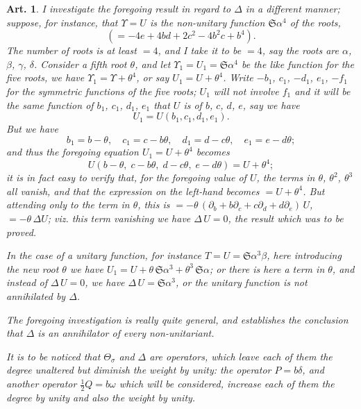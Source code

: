 \documentclass[11pt,a4paper]{article}
\theoremstyle{cayley}
\newtheorem{art}{Art.}[section]
\begin{document}
\setcounter{art}{23}
\begin{art}
I investigate the foregoing result in regard to $\Delta$ in a different manner; suppose, for instance, that $\Upsilon = U$ is the non-unitary function $\mathfrak{S}\alpha^{4}$ of the roots,
\[
(= -4e + 4bd + 2c^{2} - 4b^{2}c + b^{4}).
\]
The number of roots is at least $= 4$, and I take it to be $= 4$, say the roots are $\alpha$, $\beta$, $\gamma$, $\delta$. Consider a fifth root $\theta$, and let $\Upsilon_{1} = U_{1} = \mathfrak{S}\alpha^{4}$ be the like function for the five roots, we have $\Upsilon_{1} = \Upsilon + \theta^{4}$, or say $U_{1} = U + \theta^{4}$. Write $-b_{1}$, $c_{1}$, $-d_{1}$, $e_{1}$, $-f_{1}$ for the symmetric functions of the five roots; $U_{1}$ will not involve $f_{1}$ and it will be the same function of $b_{1}$, $c_{1}$, $d_{1}$, $e_{1}$ that $U$ is of $b$, $c$, $d$, $e$, say we have
\[
U_{1} = U(b_{1}, c_{1}, d_{1}, e_{1}).
\]
But we have
\[
b_{1} = b - \theta,\quad c_{1} = c - b\theta,\quad d_{1} = d - c\theta,\quad e_{1} = e - d\theta;
\]
and thus the foregoing equation $U_{1} = U + \theta^{4}$ becomes
\[
U(b - \theta,\; c - b\theta,\; d - c\theta,\; e - d\theta) = U + \theta^{4};
\]
it is in fact easy to verify that, for the foregoing value of $U$, the terms in $\theta$, $\theta^{2}$, $\theta^{3}$ all vanish, and that the expression on the left-hand becomes $= U + \theta^{4}$. But attending only to the term in $\theta$, this is $= -\theta\,(\partial_{b} + b\partial_{c} + c\partial_{d} + d\partial_{e})\,U$, $= -\theta\,\Delta U$; viz. this term vanishing we have $\Delta\,U = 0$, the result which was to be proved.

In the case of a unitary function, for instance $T = U = \mathfrak{S}\alpha^{3}\beta$, here introducing the new root $\theta$ we have $U_{1} = U + \theta\,\mathfrak{S}\alpha^{3} + \theta^{3}\,\mathfrak{S}\alpha$; or there is here a term in $\theta$, and instead of $\Delta\,U = 0$, we have $\Delta\,U = \mathfrak{S}\alpha^{3}$, or the unitary function is not annihilated by $\Delta$.

The foregoing investigation is really quite general, and establishes the conclusion that $\Delta$ is an annihilator of every non-unitariant.

It is to be noticed that $\Theta_{\sigma}$ and $\Delta$ are operators, which leave each of them the degree unaltered but diminish the weight by unity: the operator $P = b\delta$, and another operator $\frac{1}{2}Q = b\omega$ which will be considered, increase each of them the degree by unity and also the weight by unity.
\end{art}
\end{document}
